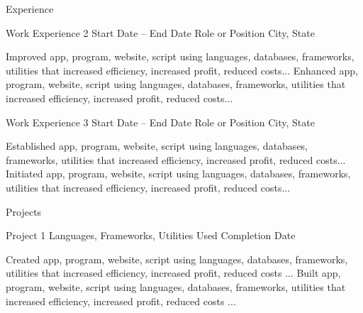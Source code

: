 \documentclass[11pt]{cv_template}
\begin{document}
\begin{cv}
\begin{cvsection}{Experience}
\begin{cvsubsection}
\end{cvsubsection}


\begin{cvsubsection}
{Work Experience 2} {Start Date -- End Date}
{Role or Position} {City, State}

\listitem Improved app, program, website, script using languages,     databases, frameworks, utilities that increased efficiency, increased    profit, reduced costs...
\listitem Enhanced app, program, website, script using languages,     databases, frameworks, utilities that increased efficiency, increased    profit, reduced costs...

\end{cvsubsection}


\begin{cvsubsection}
{Work Experience 3} {Start Date -- End Date}
{Role or Position} {City, State}

\listitem Established app, program, website, script using languages,    databases, frameworks, utilities that increased efficiency, increased    profit, reduced costs...
\listitem Initiated app, program, website, script using languages,    databases, frameworks, utilities that increased efficiency, increased    profit, reduced costs...

\end{cvsubsection}


\end{cvsection}


\begin{cvsection}{Projects}


\begin{cvsubsection}
{Project 1} {Languages, Frameworks, Utilities Used} {Completion Date} {}

\listitem Created app, program, website, script using languages,    databases,   frameworks, utilities that increased efficiency, increased    profit, reduced   costs ...
\listitem Built app, program, website, script using languages,  databases,     frameworks, utilities that increased efficiency, increased   profit, reduced     costs ...


\end{cvsubsection}
\end{cvsection}
\end{cv}
\end{document}

